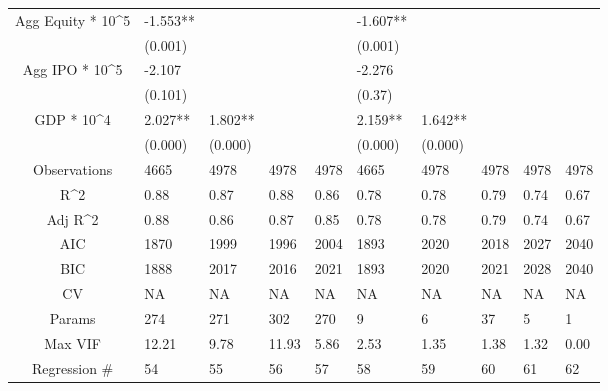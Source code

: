 \documentclass{article}
\begin{document}
\begin{table}[H]
\begin{tabular}{|clllllllll|}
  Agg Equity * 10^5 & -1.553** &  &  &  & -1.607** &  &  &  &  \\ 
   & (0.001) &  &  &  & (0.001) &  &  &  &  \\ 
  Agg IPO * 10^5 & -2.107 &  &  &  & -2.276 &  &  &  &  \\ 
   & (0.101) &  &  &  & (0.37) &  &  &  &  \\ 
  GDP * 10^4 & 2.027** & 1.802** &  &  & 2.159** & 1.642** &  &  &  \\ 
   & (0.000) & (0.000) &  &  & (0.000) & (0.000) &  &  &  \\ 
  \hline 
 Observations & 4665 & 4978 & 4978 & 4978 & 4665 & 4978 & 4978 & 4978 & 4978 \\ 
  R^2 & 0.88 & 0.87 & 0.88 & 0.86 & 0.78 & 0.78 & 0.79 & 0.74 & 0.67 \\ 
  Adj R^2 & 0.88 & 0.86 & 0.87 & 0.85 & 0.78 & 0.78 & 0.79 & 0.74 & 0.67 \\ 
  AIC & 1870 & 1999 & 1996 & 2004 & 1893 & 2020 & 2018 & 2027 & 2040 \\ 
  BIC & 1888 & 2017 & 2016 & 2021 & 1893 & 2020 & 2021 & 2028 & 2040 \\ 
  CV & NA & NA & NA & NA & NA & NA & NA & NA & NA \\ 
  Params & 274 & 271 & 302 & 270 & 9 & 6 & 37 & 5 & 1 \\ 
  Max VIF & 12.21 & 9.78 & 11.93 & 5.86 & 2.53 & 1.35 & 1.38 & 1.32 & 0.00 \\ 
  Regression \# & 54 & 55 & 56 & 57 & 58 & 59 & 60 & 61 & 62 \\ 
   \hline
\end{tabular}
 
\end{table}
\end{document}
